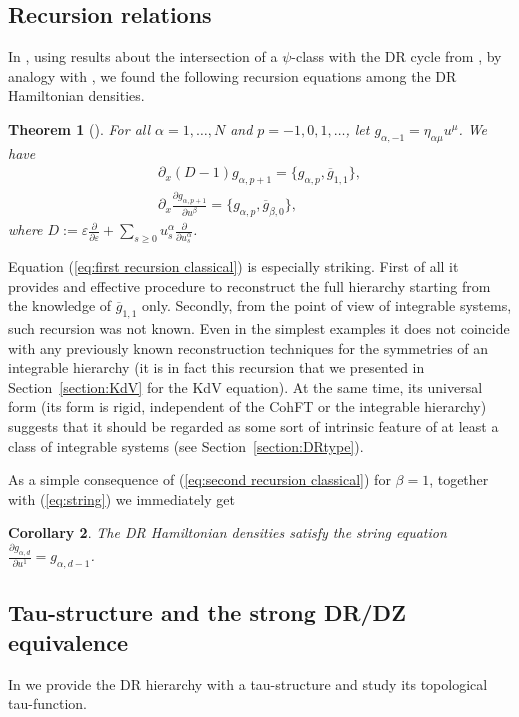 \documentclass[pdftex]{sigma}
\numberwithin{equation}{section}
\newtheorem{Theorem}{Theorem}[section]
\newtheorem{Corollary}[Theorem]{Corollary}
\newcommand{\og}{\overline g}
\def\d{{\partial}}
\newcommand{\<}{\left<}
\renewcommand{\>}{\right>}
\newcommand{\eps}{\varepsilon}
\begin{document}
\subsection{Recursion relations} In \cite{BR14}, using results about the intersection of a $\psi$-class with the DR cycle from \cite{BSSZ15}, by analogy with \cite{FR10}, we found the following recursion equations among the DR Hamiltonian densities.

\begin{Theorem}[\cite{BR15}]\label{theorem:recursion classical}
For all $\alpha=1,\dots,N$ and $p=-1,0,1,\dots$, let $g_{\alpha,-1}=\eta_{\alpha\mu}u^\mu$. We have
\begin{gather}\label{eq:first recursion classical}
\partial_x (D-1) g_{\alpha,p+1} = \big\{ g_{\alpha,p} , \og_{1,1} \big\},
\\\label{eq:second recursion classical}
\partial_x \frac{\partial g_{\alpha,p+1}}{\partial u^\beta} = \big\{g_{\alpha,p}, \og_{\beta,0} \big\},
\end{gather}
where $D:=\eps\frac{\partial}{\partial\eps} + \sum\limits_{s\ge 0} u^\alpha_s\frac{\partial}{\partial u^\alpha_s}$.
\end{Theorem}

Equation (\ref{eq:first recursion classical}) is especially striking. First of all it provides and ef\/fective procedure to reconstruct the full hierarchy starting from the knowledge of $\og_{1,1}$ only. Secondly, from the point of view of integrable systems, such recursion was not known. Even in the simplest examples it does not coincide with any previously known reconstruction techniques for the symmetries of an integrable hierarchy (it is in fact this recursion that we presented in Section~\ref{section:KdV} for the KdV equation). At the same time, its universal form (its form is rigid, independent of the CohFT or the integrable hierarchy) suggests that it should be regarded as some sort of intrinsic feature of at least a class of integrable systems (see Section~\ref{section:DRtype}).

As a simple consequence of (\ref{eq:second recursion classical}) for $\beta=1$, together with (\ref{eq:string}) we immediately get
\begin{Corollary}
The DR Hamiltonian densities satisfy the string equation $\frac{\d g_{\alpha,d}}{\d u^1} = g_{\alpha,d-1}$.
\end{Corollary}

\subsection{Tau-structure and the strong DR/DZ equivalence} In \cite{BDGR16a} we provide the DR hierarchy with a tau-structure and study its topological tau-function.
\end{document}
